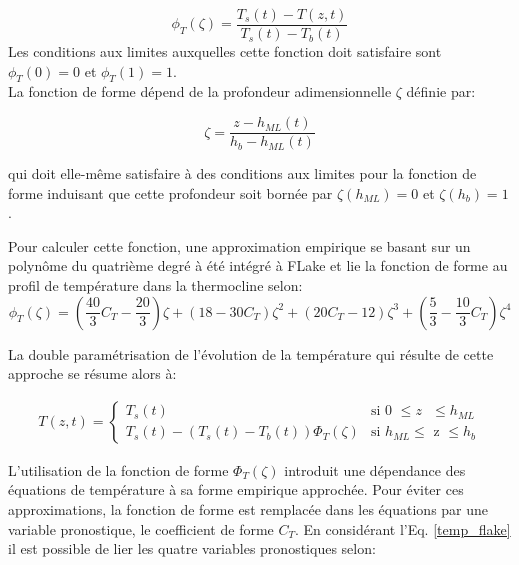 \begin{equation}
\phi_{T}(\zeta) = \frac{T_{s}(t) - T(z,t)}{T_{s}(t)-T_{b}(t)}
\end{equation}
Les conditions aux limites auxquelles cette fonction doit satisfaire sont $\phi_{T}(0)=0$ et $\phi_{T}(1)=1$. \\

\noindent La fonction de forme dépend de la profondeur adimensionnelle $\zeta$ définie par:

\begin{equation}
\zeta = \frac{z-h_{ML}(t)}{h_{b}-h_{ML}(t)}
\end{equation}

\noindent qui doit elle-même satisfaire à des conditions aux limites pour la fonction de forme induisant que cette profondeur soit bornée par $\zeta(h_{ML})=0$ et $\zeta(h_{b})=1$. 
\clearpage

\noindent Pour calculer cette fonction, une approximation empirique se basant sur un polynôme du quatrième degré à été intégré à FLake et lie la fonction de forme au profil de température dans la thermocline selon: \\

\begin{equation}
\phi_{T} (\zeta)=\left(\frac{40}{3}C_{T}-\frac{20}{3}\right) \zeta +(18-30C_{T})\zeta^{2}+(20C_{T}-12)\zeta^{3}+\left(\frac{5}{3}-\frac{10}{3}C_{T}\right)\zeta^{4} 
\end{equation}

\noindent La double paramétrisation de l'évolution de la température qui résulte de cette approche se résume alors à:

\begin{align}\label{temp_flake}
T(z,t)=
\begin{cases}
 T_{s}(t) & \text{si 0 $\leq z$ $\leq h_{ML}$}\\
 T_{s}(t)-(T_{s}(t)-T_{b}(t))\Phi_{T}(\zeta )& \text{si $h_{ML} \leq$ z $\leq h_{b}$}
\end{cases}
\end{align}

\noindent L'utilisation de la fonction de forme $\Phi_{T}(\zeta )$ introduit une dépendance des équations de température à sa forme empirique approchée. Pour éviter ces approximations, la fonction de forme est remplacée dans les équations par une variable pronostique, le coefficient de forme $C_{T}$. En considérant l'Eq. \eqref{temp_flake} il est possible de lier les quatre variables pronostiques selon:


